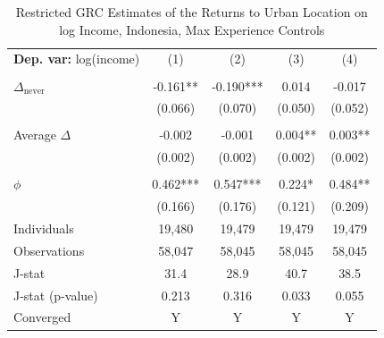\begin{table}[htbp] \centering \begin{threeparttable}
 \caption{Restricted GRC Estimates of the Returns to Urban Location on log Income, Indonesia, Max Experience Controls} 
 \label{tab:GRC_IDN_income_urban_unb_exp_max} 
\begin{tabular}{l cccc} \toprule  \textbf{Dep. var:}  log(income) 
                    &\multicolumn{1}{c}{(1)}   &\multicolumn{1}{c}{(2)}   &\multicolumn{1}{c}{(3)}   &\multicolumn{1}{c}{(4)}   \\
                    &               &               &               &               \\
\addlinespace
$\Delta_{\text{never}}$&      -0.161** &      -0.190***&       0.014   &      -0.017   \\
                    &     (0.066)   &     (0.070)   &     (0.050)   &     (0.052)   \\
                    &               &               &               &               \\
\addlinespace
Average $\Delta$    &      -0.002   &      -0.001   &       0.004** &       0.003** \\
                    &     (0.002)   &     (0.002)   &     (0.002)   &     (0.002)   \\
                    &               &               &               &               \\
\addlinespace
$\phi$              &       0.462***&       0.547***&       0.224*  &       0.484** \\
                    &     (0.166)   &     (0.176)   &     (0.121)   &     (0.209)   \\
\addlinespace
Individuals         &      19,480   &      19,479   &      19,479   &      19,479   \\
Observations        &      58,047   &      58,045   &      58,045   &      58,045   \\
J-stat              &        31.4   &        28.9   &        40.7   &        38.5   \\
J-stat (p-value)    &       0.213   &       0.316   &       0.033   &       0.055   \\
Converged           &           Y   &           Y   &           Y   &           Y   \\

\end{tabular}
\end{threeparttable}
\end{table}
